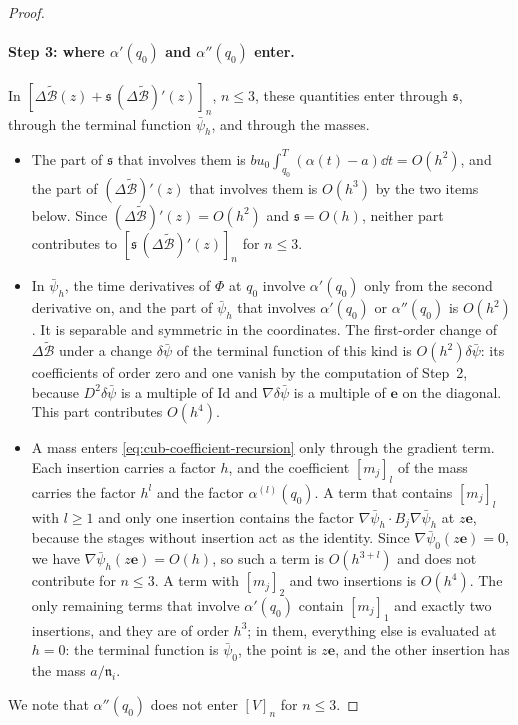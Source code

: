 \begin{proof}
\paragraph{Step 3: where $\alpha'(q_0)$ and $\alpha''(q_0)$ enter.} In
$[\Delta\widetilde{\mathcal B}(z)+\mathfrak s\,(\Delta\widetilde{\mathcal B})'(z)]_n$, $n\le3$, these quantities enter through $\mathfrak s$,
through the terminal function $\bar\psi_h$, and through the masses.
\begin{itemize}
\item The part of $\mathfrak s$ that involves them is
 $bu_0\int_{q_0}^T(\alpha(t)-a)\dd t=O(h^2)$, and the part of $(\Delta\widetilde{\mathcal B})'(z)$ that
 involves them is $O(h^3)$ by the two items below. Since $(\Delta\widetilde{\mathcal B})'(z)=O(h^2)$ and
 $\mathfrak s=O(h)$, neither part contributes to $[\mathfrak s\,(\Delta\widetilde{\mathcal B})'(z)]_n$ for $n\le3$.
\item In $\bar\psi_h$, the time derivatives of $\Phi$ at $q_0$ involve
 $\alpha'(q_0)$ only from the second derivative on, and the part of $\bar\psi_h$ that
 involves $\alpha'(q_0)$ or $\alpha''(q_0)$ is $O(h^2)$. It is separable and
 symmetric in the coordinates. The first-order change of $\Delta\widetilde{\mathcal B}$ under a change
 $\delta\bar\psi$ of the terminal function of this kind is $O(h^2)\delta\bar\psi$: its
 coefficients of order zero and one vanish by the computation of Step~2,
 because $D^2\delta\bar\psi$ is a multiple of $\mathrm{Id}$ and $\nabla\delta\bar\psi$ is a multiple
 of $\mathbf e$ on the diagonal. This part contributes $O(h^4)$.
\item A mass enters \eqref{eq:cub-coefficient-recursion} only through the
 gradient term. Each insertion carries a factor $h$, and the coefficient $[m_j]_l$ of the mass carries the factor $h^l$ and
 the factor $\alpha^{(l)}(q_0)$. A term that contains $[m_j]_l$ with $l\ge1$
 and only one insertion contains the factor $\nabla\bar\psi_h\cdot B_j\nabla\bar\psi_h$ at
 $z\mathbf e$, because the stages without insertion act as the identity. Since
 $\nabla\bar\psi_0(z\mathbf e)=0$, we have $\nabla\bar\psi_h(z\mathbf e)=O(h)$, so such a
 term is $O(h^{3+l})$ and does not contribute for $n\le3$. A term with
 $[m_j]_2$ and two insertions is $O(h^4)$. The only remaining terms that
 involve $\alpha'(q_0)$ contain $[m_j]_1$ and exactly two insertions, and they
 are of order $h^3$; in them, everything else is evaluated at $h=0$: the
 terminal function is $\bar\psi_0$, the point is $z\mathbf e$, and the other insertion
 has the mass $a/\mathfrak n_i$.
\end{itemize}
We note that $\alpha''(q_0)$ does not enter $[V]_n$ for $n\le3$.


\end{proof}
